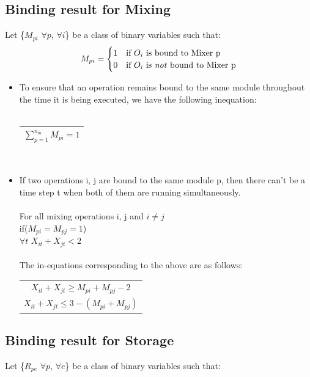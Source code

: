 \documentclass{article}
\newcommand{\eqn}[1]{
  \begin{tabular}{|c|}
  \hline
  $#1$\\
  \hline
  \end{tabular}
}
\begin{document}
\subsection{Binding result for Mixing}
Let \{$M_{pi}$ $\forall p$, $\forall i$\} be a class of binary variables such that:\\

\begin{equation*}
  M_{pi} = \begin{cases}
  1  &  \text{if }O_i \text{ is bound to Mixer p} \\
  0  &  \text{if }O_i \text{ is \emph{not} bound to Mixer p}
  \end{cases}
\end{equation*}

\begin{itemize}

\item To ensure that an operation remains bound to the
same module throughout the time it is being executed, we have 
the following inequation:\\\\
\eqn{\sum\limits_{p=1}^{n_m}M_{pi}=1}\\

\item If two operations i, j are bound to the same module p, then 
there can't be a time step t when both of them are running simultaneously.\\
\\
For all mixing operations i, j and $i\neq j$ \\if($M_{pi}=M_{pj}=1$)\\
\indent $\forall t$ $X_{it}+ X_{jt} < 2$\\
\\
The in-equations corresponding to the above are as follows:\\ 
\begin{tabular}{|c|}
\hline
$X_{it}+X_{jt}\geq M_{pi}+M_{pj}-2$\\
$X_{it}+X_{jt}\leq 3-(M_{pi}+M_{pj})$\\
\hline
\end{tabular}
\end{itemize}

\subsection{Binding result for Storage}
Let \{$R_{pe}$ $\forall p$, $\forall e$\} be a class of binary variables such that:\\
\end{document}
